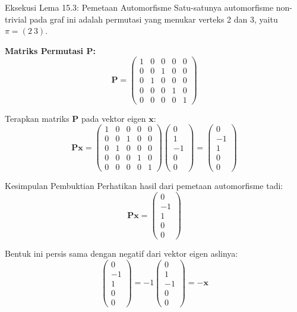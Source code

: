 \documentclass[aspectratio=169]{beamer}
\begin{document}
\begin{frame}[fragile]{Eksekusi Lema 15.3: Pemetaan Automorfisme}
  Satu-satunya automorfisme non-trivial pada graf ini adalah permutasi yang menukar verteks 2 dan 3, yaitu $\pi = (2\ 3)$.

  \textbf{Matriks Permutasi $\mathbf{P}$:}
  $$ \mathbf{P} = \begin{pmatrix}
      1 & 0 & 0 & 0 & 0 \\
      0 & 0 & 1 & 0 & 0 \\
      0 & 1 & 0 & 0 & 0 \\
      0 & 0 & 0 & 1 & 0 \\
      0 & 0 & 0 & 0 & 1
    \end{pmatrix} $$

  Terapkan matriks $\mathbf{P}$ pada vektor eigen $\mathbf{x}$:
  $$ \mathbf{P}\mathbf{x} = \begin{pmatrix} 1 & 0 & 0 & 0 & 0 \\ 0 & 0 & 1 & 0 & 0 \\ 0 & 1 & 0 & 0 & 0 \\ 0 & 0 & 0 & 1 & 0 \\ 0 & 0 & 0 & 0 & 1 \end{pmatrix} \begin{pmatrix} 0 \\ 1 \\ -1 \\ 0 \\ 0 \end{pmatrix} = \begin{pmatrix} 0 \\ -1 \\ 1 \\ 0 \\ 0 \end{pmatrix} $$
\end{frame}

\begin{frame}{Kesimpulan Pembuktian}
  Perhatikan hasil dari pemetaan automorfisme tadi:
  $$ \mathbf{P}\mathbf{x} = \begin{pmatrix} 0 \\ -1 \\ 1 \\ 0 \\ 0 \end{pmatrix} $$

  Bentuk ini persis sama dengan negatif dari vektor eigen aslinya:
  $$ \begin{pmatrix} 0 \\ -1 \\ 1 \\ 0 \\ 0 \end{pmatrix} = -1 \begin{pmatrix} 0 \\ 1 \\ -1 \\ 0 \\ 0 \end{pmatrix} = -\mathbf{x} $$
\end{frame}
\end{document}
